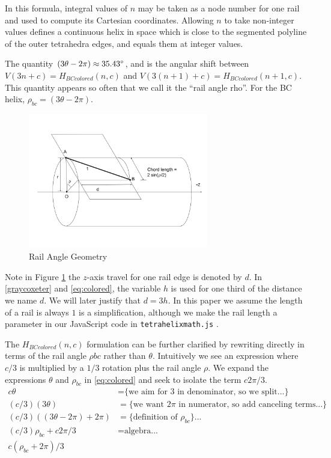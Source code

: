 \documentclass[11pt]{article}
\begin{document}
In this formula, integral values of $n$ may be taken as a node number for one rail and used to compute its Cartesian
coordinates. Allowing $n$ to take non-integer values defines a continuous
helix in space which is close to the segmented polyline of the outer tetrahedra edges, and equals them at integer
values.

The quantity $ (3 \theta - 2 \pi) \approx 35.43 \degree $, and is the angular shift between $V(3n+c)=H_{BCcolored}(n,c)$ and
$V(3(n+1)+c)=H_{BCcolored}(n+1,c)$.
This quantity appears so often that we call it the ``rail angle rho''. For the BC helix, $\rho_{bc} = (3 \theta - 2 \pi)$.

\begin{figure}[H]
  \label{railanglefig}
     \centering
     \includegraphics[width=0.7\textwidth]{figures/RailAngleGeometry.png}
     \caption{Rail Angle Geometry}
\end{figure}

Note in Figure \ref{railanglefig} the $z$-axis travel for one rail edge is denoted by $d$. In \eqref{graycoxeter} and \eqref{eq:colored}, the variable
$h$ is used for one third of the distance we name $d$. We will later justify that $d = 3h$. In this paper we assume the length of a rail
is always $1$ is a simplification, although we make the rail length a parameter in our JavaScript code in \texttt{tetrahelixmath.js} \cite{readtetrahelix}.

The $H_{BCcolored}(n,c)$ formulation can be further clarified by rewriting directly in terms of the rail angle $\rho{bc}$ rather than $\theta$.
Intuitively we see an expression where $c/3$ is multiplied by a $1/3$ rotation plus the rail angle $\rho$.
We expand 
the expressions $\theta$ and $\rho_{bc}$ in \eqref{eq:colored} and seek to isolate the term $c2\pi/3 $.
\begin{align*}
 c \theta  &=   \text{\{we aim for 3 in denominator, so we split...\}} \\
    (c/3)  (3 \theta)  &=   \text{\{we want $2\pi$ in numerator, so add canceling terms...\}} \\
 (c/ 3) ((3 \theta - 2 \pi)  + 2 \pi) &= \text{\{definition of $\rho_{bc}$\}...} \\  
  (c / 3) \rho_{bc}  + c 2 \pi /3 &=  \text{algebra...} \\  
c  ( \rho_{bc} +  2 \pi) /3  \\
\end{align*}
\end{document}
